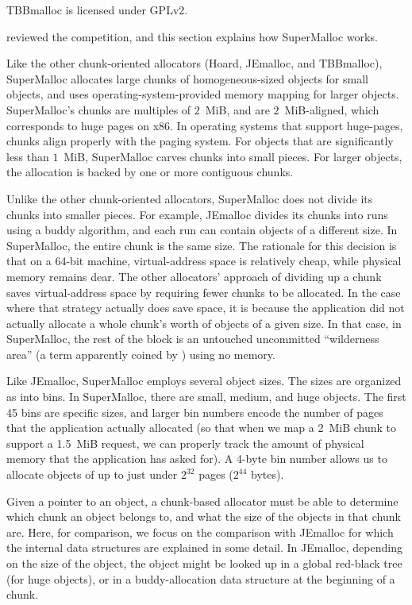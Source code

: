 \documentclass[pldi]{sigplanconf-pldi15}
\begin{document}
TBBmalloc is licensed under GPLv2.


 reviewed the competition, and this section explains how
SuperMalloc works.   

Like the other chunk-oriented allocators (Hoard, JEmalloc, and
TBBmalloc), SuperMalloc allocates large chunks of homogeneous-sized
objects for small objects, and uses operating-system-provided memory
mapping for larger objects.  SuperMalloc's chunks are multiples of
$2$~MiB, and are $2$~MiB-aligned, which corresponds to huge pages on
x86.  In operating systems that support huge-pages, chunks align
properly with the paging system.  For objects that are significantly
less than $1$~MiB, SuperMalloc carves chunks into small pieces.  For
larger objects, the allocation is backed by one or more contiguous
chunks.

Unlike the other chunk-oriented allocators, SuperMalloc does not
divide its chunks into smaller pieces.  For example, JEmalloc divides
its chunks into runs using a buddy algorithm, and each run can contain
objects of a different size.  In SuperMalloc, the entire chunk is the
same size.  The rationale for this decision is that on a 64-bit
machine, virtual-address space is relatively cheap, while physical
memory remains dear.  The other allocators' approach of dividing up a
chunk saves virtual-address space by requiring fewer chunks to be
allocated.  In the case where that strategy actually does save space,
it is because the application did not actually allocate a whole
chunk's worth of objects of a given size.  In that case, in
SuperMalloc, the rest of the block is an untouched uncommitted
``wilderness area'' (a term apparently coined by \cite{KornVo85})
using no memory.

Like JEmalloc, SuperMalloc employs several object sizes.  The sizes
are organized as into bins.  In SuperMalloc, there are small, medium,
and huge objects.  The first 45 bins are specific sizes, and larger
bin numbers encode the number of pages that the application actually
allocated (so that when we map a 2~MiB chunk to support a 1.5~MiB
request, we can properly track the amount of physical memory that the
application has asked for).  A 4-byte bin number allows us to allocate
objects of up to just under $2^{32}$ pages ($2^{44}$ bytes).

Given a pointer to an object, a chunk-based allocator must be able to
determine which chunk an object belongs to, and what the size of the
objects in that chunk are.  Here, for comparison, we focus on the
comparison with JEmalloc for which the internal data structures are
explained in some detail.  In JEmalloc, depending on the size of the
object, the object might be looked up in a global red-black tree (for
huge objects), or in a buddy-allocation data structure at the
beginning of a chunk.  
\end{document}
